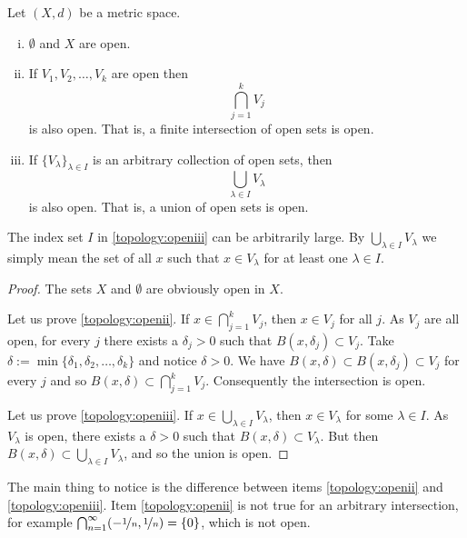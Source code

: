 \begin{prop} \label{prop:topology:open}
Let $(X,d)$ be a metric space.
\begin{enumerate}[(i)]
\item \label{topology:openi} $\emptyset$ and $X$ are open.
\item \label{topology:openii} If $V_1, V_2, \ldots, V_k$ are open then
\begin{equation*}
\bigcap_{j=1}^k V_j
\end{equation*}
is also open.  That is, a finite intersection of open sets is open.
\item \label{topology:openiii} If $\{ V_\lambda \}_{\lambda \in I}$ is
an arbitrary collection of open sets, then
\begin{equation*}
\bigcup_{\lambda \in I} V_\lambda
\end{equation*}
is also open.  That is, a union of open sets is open.
\end{enumerate}
\end{prop}

The index set $I$ in \ref{topology:openiii} can be arbitrarily large.
By $\bigcup_{\lambda \in I} V_\lambda$ we simply mean the set of
all $x$ such that $x \in V_\lambda$ for at least one $\lambda \in I$.

\begin{proof}
The sets $X$ and $\emptyset$ are obviously open in $X$.

Let us prove \ref{topology:openii}.
If $x \in \bigcap_{j=1}^k V_j$, then $x \in V_j$ for all $j$.
As $V_j$ are all open, for every $j$ there exists a $\delta_j > 0$ 
such that $B(x,\delta_j) \subset V_j$.  Take $\delta := \min \{
\delta_1,\delta_2,\ldots,\delta_k \}$ and notice $\delta > 0$.  We have
$B(x,\delta) \subset B(x,\delta_j) \subset V_j$ for every $j$ and so
$B(x,\delta) \subset \bigcap_{j=1}^k V_j$.  Consequently the intersection is open.

Let us prove \ref{topology:openiii}.
If $x \in \bigcup_{\lambda \in I} V_\lambda$, then $x \in V_\lambda$ for some
$\lambda \in I$.
As $V_\lambda$ is open, there exists a $\delta > 0$
such that $B(x,\delta) \subset V_\lambda$.  But then
$B(x,\delta) \subset \bigcup_{\lambda \in I} V_\lambda$,
and so the union is open.
\end{proof}

\begin{example}
The main thing to notice is the difference between
items
\ref{topology:openii} and \ref{topology:openiii}.
Item \ref{topology:openii} is not true for an arbitrary intersection,
for example $\bigcap_{n=1}^\infty (-\nicefrac{1}{n},\nicefrac{1}{n}) = \{ 0
\}$, which is not open.
\end{example}


